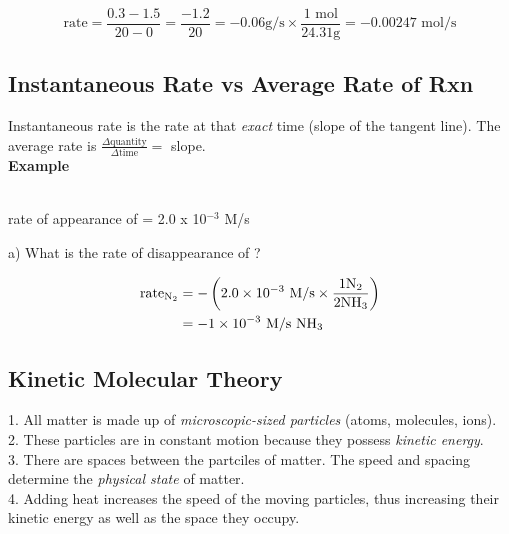 \documentclass[11pt]{article}
\begin{document}
    \begin{equation*}
        \text{rate} = \frac{0.3-1.5}{20-0} = \frac{-1.2}{20} = -0.06\text{g/s} \times \frac{1 \text{ mol}}{24.31\text{g}} = -0.00247 \text{ mol/s}
    \end{equation*}

    \subsection{Instantaneous Rate vs Average Rate of Rxn}
    Instantaneous rate is the rate at that \emph{exact} time (slope of the tangent line). The average rate is $\frac{\Delta \text{quantity}}{\Delta \text{time}} = $ slope. \\

    \textbf{Example} \\
    \begin{center}
         \\
        rate of appearance of  = 2.0 x 10$^{-3}$ M/s \\
    \end{center}

    a) What is the rate of disappearance of ?

    \begin{equation*}
        \begin{aligned}
            \text{rate}_{\ce{ N2}} &= -\left(2.0 \times 10^{-3} \text{ M/s} \times \frac{1 \ce{ N2}}{2 \ce{ NH3}}\right) \\
            &= -1 \times 10^{-3} \text{ M/s \ce{NH3}}
        \end{aligned}
    \end{equation*}

    \subsection{Kinetic Molecular Theory}
    1. All matter is made up of \emph{microscopic-sized particles} (atoms, molecules, ions). \\
    2. These particles are in constant motion because they possess \emph{kinetic energy}. \\
    3. There are spaces between the partciles of matter. The speed and spacing determine the \emph{physical state} of matter. \\
    4. Adding heat increases the speed of the moving particles, thus increasing their kinetic energy as well as the space they occupy.
\end{document}
